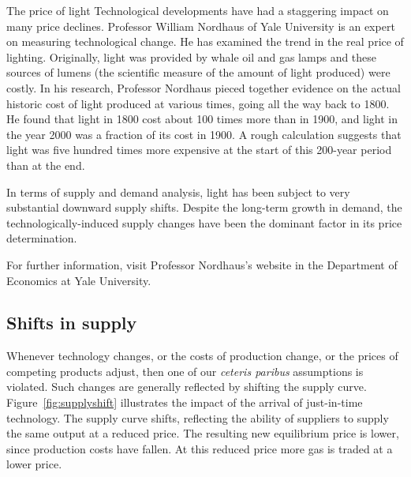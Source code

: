 \begin{ApplicationBox}{The price of light \label{app:pricelight}}
Technological developments have had a staggering impact on many price declines. Professor William Nordhaus of Yale University is an expert on measuring technological change. He has examined the trend in the real price of lighting. Originally, light was provided by whale oil and gas lamps and these sources of lumens (the scientific measure of the amount of light produced) were costly. In his research, Professor Nordhaus pieced together evidence on the actual historic cost of light produced at various times, going all the way back to 1800. He found that light in 1800 cost about 100 times more than in 1900, and light in the year 2000 was a fraction of its cost in 1900. A rough calculation suggests that light was five hundred times more expensive at the start of this 200-year period than at the end.

\bigskip
In terms of supply and demand analysis, light has been subject to very substantial downward supply shifts. Despite the long-term growth in demand, the technologically-induced supply changes have been the dominant factor in its price determination.

\bigskip
For further information, visit Professor Nordhaus's website in the Department of Economics at Yale University.
\end{ApplicationBox}

\subsection*{Shifts in supply}

Whenever technology changes, or the costs of production change, or the prices of competing products adjust, then one of our \textit{ceteris paribus} assumptions is violated. Such changes are generally reflected by shifting the supply curve. Figure~\ref{fig:supplyshift} illustrates the impact of the arrival of just-in-time technology. The supply curve shifts, reflecting the ability of suppliers to supply the same output at a reduced price. The resulting new equilibrium price is lower, since production costs have fallen. At this reduced price more gas is traded at a lower price.

